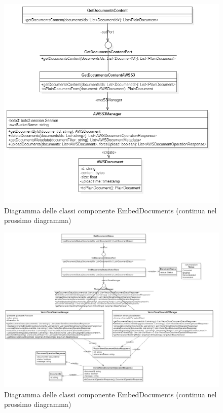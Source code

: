 \documentclass[10pt, a4paper]{article}
\begin{document}
\begin{figure}[H]
    \centering        
    \includegraphics[width=14.5cm]{img/EmbedDocs1.png}
    \caption{Diagramma delle classi componente EmbedDocuments (continua nel prossimo diagramma)}
\end{figure}




\begin{figure}[H]
    \centering        
    \includegraphics[width=15.5cm]{img/EmbedDocs2.png}
    \caption{Diagramma delle classi componente EmbedDocuments (continua nel prossimo diagramma)}
\end{figure}
\end{document}

